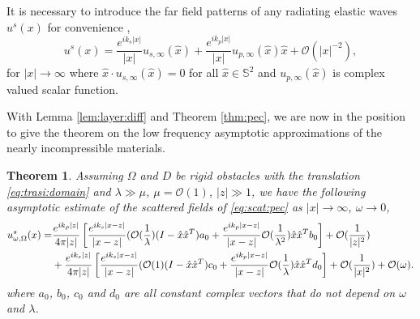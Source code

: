 \documentclass[a4paper,11pt]{article}
\newcommand{\mO}{\mathcal{O}}
\newtheorem{theorem}{Theorem}[section]
\theoremstyle{remark}
\theoremstyle{definition}
\numberwithin{equation}{section}
\begin{document}
It is necessary to introduce the far field patterns of any radiating elastic waves $u^{s}(x)$ for convenience \cite{AK, PH},
\[
u^{s}(x) = \frac{e^{ik_{s}|x|}}{|x|}u_{s,\infty}(\hat{x}) + \frac{e^{ik_{p}|x|}}{|x|}u_{p,\infty}(\hat{x})\hat{x} + \mathcal{O}(|x|^{-2}),
\]
for $|x| \rightarrow \infty$ where $\hat{x}\cdot u_{s,\infty}(\hat{x})=0$ for all $\hat{x} \in \mathbb{S}^2$ and $u_{p,\infty}(\hat{x})$ is complex valued scalar function.

With Lemma \ref{lem:layer:diff} and Theorem \ref{thm:pec}, we are now in the position to give the theorem on the low frequency asymptotic approximations of the nearly incompressible materials.
\begin{theorem}\label{thm:obstacle:asym}
Assuming $\Omega$ and $D$ be rigid obstacles with the translation \eqref{eq:trasi:domain} and $\lambda  \gg \mu$, $ \mu = \mO(1)$, $|z| \gg 1$, we
have the following asymptotic estimate of the scattered fields of \eqref{eq:scat:pec} as $|x| \rightarrow \infty$,  $\omega \rightarrow 0$,
\begin{align}
 u_{\omega,\Omega}^s(x)  =& \frac{e^{ik_p|z|}}{4 \pi |z|} \left[ \frac{e^{ik_s|x-z|}}{|x-z|} (\mO(\frac{1}{\lambda})(I-\hat{x}\hat{x}^T)a_0 + \frac{e^{ik_p|x-z|}}{|x-z|}\mO(\frac{1}{\lambda^2}) \hat{x}\hat{x}^{T}b_0 \right] + \mO(\frac{1}{|z|^2}) \label{eq:asym:obs:lambda}\\
 &+\frac{e^{ik_s|z|}}{4 \pi |z|} \left[ \frac{e^{ik_s|x-z|}}{|x-z|} (\mO(1)(I-\hat{x}\hat{x}^T)c_0  + \frac{e^{ik_p|x-z|}}{|x-z|}
 \mO(\frac{1}{\lambda}) \hat{x}\hat{x}^{T}d_0\right] + \mathcal{O}(\frac{1}{|x|^2}) + \mO(\omega). \notag
\end{align}
where $a_0$, $b_0$, $c_0$ and $d_0$ are all constant complex vectors that do not depend on $\omega$ and $\lambda$.
\end{theorem}
\end{document}
